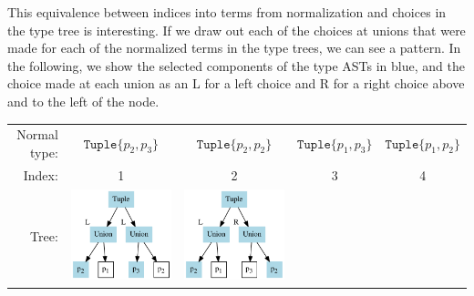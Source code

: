 \documentclass[a4paper,english]{lipics-v2019}
\newcommand{\xt}[1]{\texttt{#1}}
\newcommand{\tuple}[1]{\xt{Tuple\{}#1\xt{\}}}
\begin{document}
This equivalence between indices into terms from normalization and choices in
the type tree is interesting. If we draw out each of the choices at unions that were made
for each of the normalized terms in the type trees, we can see a pattern. In the following,
we show the selected components of the type ASTs in blue, and the choice made at each union
as an L for a left choice and R for a right choice above and to the left of the node.

\begin{tabular}{r|c|c|c|c}
Normal type:&$\tuple{p_2,p_3}$&$\tuple{p_2,p_2}$&$\tuple{p_1,p_3}$&$\tuple{p_1,p_2}$\\
Index:&1 & 2 & 3 & 4\\
Tree:&\includegraphics[scale=0.35]{figures-gen/exmp2a.pdf} &
\includegraphics[scale=0.35]{figures-gen/exmp2b.pdf} &

\end{tabular}
\end{document}
